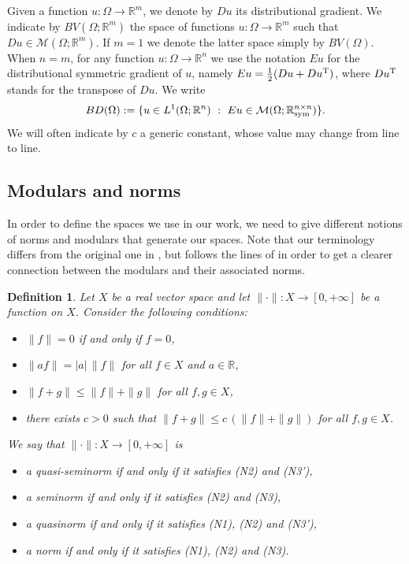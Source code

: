 \documentclass[a4paper,11pt,oneside,notitlepage]{article}
\newtheorem{definition}[theorem]{Definition}
\numberwithin{equation}{section}
\def\R{\mathbb{R}}
\def\M{\mathcal{M}}
\def\sym{{\rm sym}}
\newcommand{\T}{\textnormal{T}}
\newcommand{\st}{ \ : \ }
\begin{document}
Given a function $u : \Omega \to \R^m$, we denote by $Du$ its distributional gradient. We indicate by $BV(\Omega;\R^m)$ the space of functions $u : \Omega \to \R^m$ such that $Du \in \M(\Omega;\R^m)$. If $m=1$ we denote the latter space simply by $BV(\Omega)$. When $n=m$, for any function $u : \Omega \to \R^n$ we use the notation $E u$ for the distributional symmetric gradient of $u$, namely $E u = \frac{1}{2} (Du + Du ^ \T)$, where $Du^\T$ stands for the transpose of $Du$. We write
\begin{equation*}
    BD(\Omega) := \{u \in L^1(\Omega;\R^n) \st E u \in \M(\Omega;\R^{n \times n}_\sym) \}.
\end{equation*}
We will often indicate by $c$ a generic constant, whose value may change from line to line.


\subsection{Modulars and norms}
\label{mod_norm}

In order to define the spaces we use in our work, we need to give different notions of norms and modulars that generate our spaces. Note that our terminology differs from the original one in \cite{Mus83}, but follows the lines of \cite{EHH, HJR} in order to get a clearer connection between the modulars and their associated norms.

\begin{definition}
\label{def:norms}
    Let $X$ be a real vector space and let $\|\cdot\|: X \to [0, +\infty]$ be a function on $X$. Consider the following conditions:
    \begin{itemize}
        \item[(N1)] $\|f\| = 0$ if and only if $f = 0$,
        \item[(N2)] $\|af\| = |a| \, \|f\|$ for all $f \in X$ and $a \in \R$,
        \item[(N3)] $\|f + g\| \le \|f\| + \|g\|$ for all $f, g \in X$,
        \item[(N3')] there exists $c > 0$ such that $\|f + g\| \le c \, (\|f\| + \|g\|)$ for all $f,g \in X$.
    \end{itemize}
    We say that $\|\cdot\| : X \to [0, +\infty]$ is
    \begin{itemize}
        \item a quasi-seminorm if and only if it satisfies (N2) and (N3'),
        \item a seminorm if and only if it satisfies (N2) and (N3),
        \item a quasinorm if and only if it satisfies (N1), (N2) and (N3'),
        \item a norm if and only if it satisfies (N1), (N2) and (N3).
    \end{itemize}
\end{definition}
\end{document}
